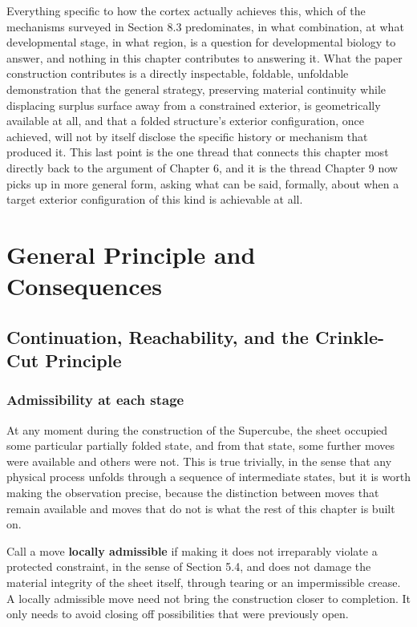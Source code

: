 \documentclass[11pt,oneside]{book}
\begin{document}
Everything specific to how the cortex actually achieves this, which of
the mechanisms surveyed in Section 8.3 predominates, in what
combination, at what developmental stage, in what region, is a question
for developmental biology to answer, and nothing in this chapter
contributes to answering it. What the paper construction contributes is
a directly inspectable, foldable, unfoldable demonstration that the
general strategy, preserving material continuity while displacing
surplus surface away from a constrained exterior, is geometrically
available at all, and that a folded structure's exterior configuration,
once achieved, will not by itself disclose the specific history or
mechanism that produced it. This last point is the one thread that
connects this chapter most directly back to the argument of Chapter 6,
and it is the thread Chapter 9 now picks up in more general form, asking
what can be said, formally, about when a target exterior configuration
of this kind is achievable at all.

\part{General Principle and Consequences}

\hypertarget{chapter-9.-continuation-reachability-and-the-crinkle-cut-principle}{%
\chapter{Continuation, Reachability, and the Crinkle-Cut
Principle}\label{chapter-9.-continuation-reachability-and-the-crinkle-cut-principle}}

\hypertarget{admissibility-at-each-stage}{%
\section{Admissibility at each
stage}\label{admissibility-at-each-stage}}

At any moment during the construction of the Supercube, the sheet
occupied some particular partially folded state, and from that state,
some further moves were available and others were not. This is true
trivially, in the sense that any physical process unfolds through a
sequence of intermediate states, but it is worth making the observation
precise, because the distinction between moves that remain available and
moves that do not is what the rest of this chapter is built on.

Call a move \textbf{locally admissible} if making it does not
irreparably violate a protected constraint, in the sense of Section 5.4,
and does not damage the material integrity of the sheet itself, through
tearing or an impermissible crease. A locally admissible move need not
bring the construction closer to completion. It only needs to avoid
closing off possibilities that were previously open.
\end{document}
